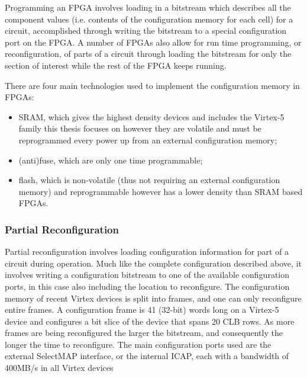 \documentclass[12pt,final,oneside]{dwThesis} %
\begin{document}
Programming an \ac{FPGA} involves loading in a bitstream which describes all the component values (i.e. contents of the configuration memory for each cell) for a circuit, accomplished through writing the bitstream to a special configuration port on the \ac{FPGA}. A number of \acp{FPGA} also allow for run time programming, or reconfiguration, of parts of a circuit through loading the bitstream for only the section of interest while the rest of the \ac{FPGA} keeps running.

There are four main technologies used to implement the configuration memory in \acp{FPGA}:
\begin{itemize}
\item \ac{SRAM}, which gives the highest density devices and includes the Virtex-5 family this thesis focuses on however they are volatile and must be reprogrammed every power up from an external configuration memory;
\item (anti)fuse, which are only one time programmable;
\item flash, which is non-volatile (thus not requiring an external configuration memory) and reprogrammable however has a lower density than \ac{SRAM} based \acp{FPGA}\cite{FPGAArch}.
\end{itemize}
\subsubsection{Partial Reconfiguration}
Partial reconfiguration involves loading configuration information for part of a circuit during operation. Much like the complete configuration described above, it involves writing a configuration bitstream to one of the available configuration ports, in this case also including the location to reconfigure. The configuration memory of recent Virtex devices is split into frames, and one can only reconfigure entire frames. A configuration frame is 41 (32-bit) words long on a Virtex-5 device and configures a bit slice of the device that spans 20 \ac{CLB} rows. As more frames are being reconfigured the larger the bitstream, and consequently the longer the time to reconfigure. The main configuration ports used are the external SelectMAP interface, or the internal \ac{ICAP}, each with a bandwidth of 400MB/s in all Virtex devices \cite{XCell33,DiesselChange}
\end{document}
